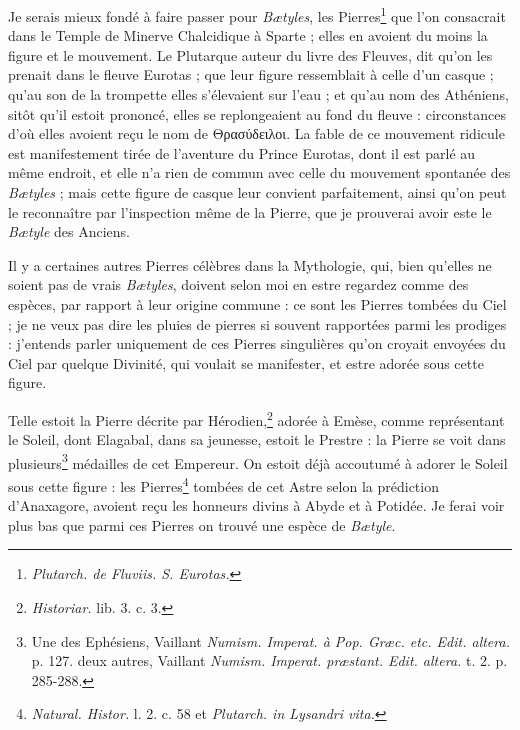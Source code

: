 \documentclass[a4paper, 11pt, oneside, polutonikogreek, french]{article}
\begin{document}
Je serais mieux fondé à faire passer pour \emph{Bætyles}, les Pierres\footnote{\emph{Plutarch. de Fluviis. S. Eurotas.}} que l'on consacrait dans le Temple de Minerve Chalcidique à Sparte ; elles en avoient du moins la figure et le mouvement. Le Plutarque auteur du livre des Fleuves, dit qu'on les prenait dans le fleuve Eurotas ; que leur figure ressemblait à celle d'un casque ; qu'au son de la trompette elles s'élevaient sur l'eau ; et qu'au nom des Athéniens, sitôt qu'il estoit prononcé, elles se replongeaient au fond du fleuve : circonstances d'où elles avoient reçu le nom de Θρασύδειλοι. La fable de ce mouvement ridicule est manifestement tirée de l'aventure du Prince Eurotas, dont il est parlé au même endroit, et elle n'a rien de commun avec celle du mouvement spontanée des \emph{Bætyles} ; mais cette figure de casque leur convient parfaitement, ainsi qu'on peut le reconnaître par l'inspection même de la Pierre, que je prouverai avoir este le \emph{Bætyle} des Anciens.

Il y a certaines autres Pierres célèbres dans la Mythologie, qui, bien qu'elles ne soient pas de vrais \emph{Bætyles}, doivent selon moi en estre regardez comme des espèces, par rapport à leur origine commune : ce sont les Pierres tombées du Ciel ; je ne veux pas dire les pluies de pierres si souvent rapportées parmi les prodiges : j'entends parler uniquement de ces Pierres singulières qu'on croyait envoyées du Ciel par quelque Divinité, qui voulait se manifester, et estre adorée sous cette figure.

Telle estoit la Pierre décrite par Hérodien,\footnote{\emph{Historiar.} lib. 3. c. 3.} adorée à Emèse, comme représentant le Soleil, dont Elagabal, dans sa jeunesse, estoit le Prestre : la Pierre se voit dans plusieurs\footnote{Une des Ephésiens, Vaillant \emph{Numism. Imperat. à Pop. Græc. etc. Edit. altera.} p. 127. deux autres, Vaillant \emph{Numism. Imperat. præstant. Edit. altera.} t. 2. p. 285-288.} médailles de cet Empereur. On estoit déjà accoutumé à adorer le Soleil sous cette figure : les Pierres\footnote{\emph{Natural. Histor.} l. 2. c. 58 et \emph{Plutarch. in Lysandri vita.}} tombées de cet Astre selon la prédiction d'Anaxagore, avoient reçu les honneurs divins à Abyde et à Potidée. Je ferai voir plus bas que parmi ces Pierres on trouvé une espèce de \emph{Bætyle}.
\end{document}
